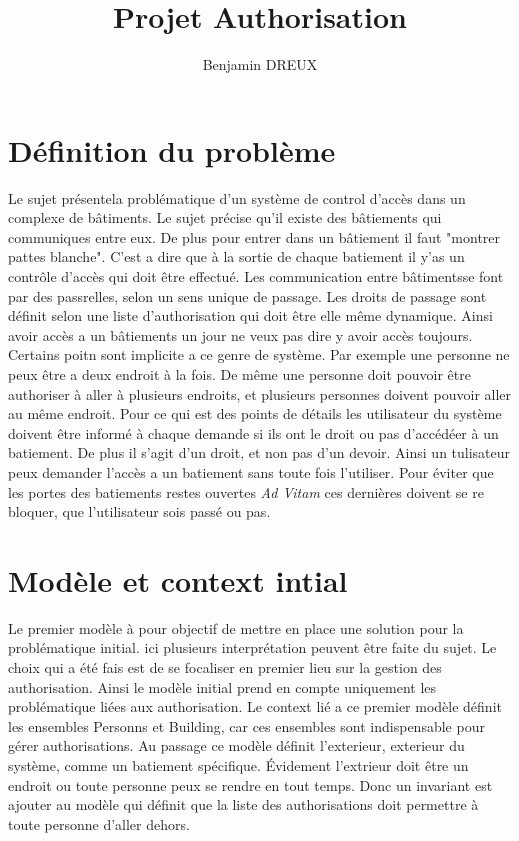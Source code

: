 \documentclass[12pt,a4paper]{article}
\title{Projet Authorisation}
\author{Benjamin DREUX}
\begin{document}
\maketitle
\section{Définition du problème}
Le sujet présentela problématique d'un système de control d'accès dans un complexe de bâtiments. Le sujet précise qu'il existe des bâtiements qui communiques entre eux. De plus pour entrer dans un bâtiement il faut "montrer pattes blanche". C'est a dire que à la sortie de chaque batiement il y'as un contrôle d'accès qui doit être effectué. Les communication entre bâtimentsse font par des passrelles, selon un sens unique de passage. Les droits de passage sont définit selon une liste d'authorisation qui doit être elle même dynamique. Ainsi avoir accès a un bâtiements un jour ne veux pas dire y avoir accès toujours.
Certains poitn sont implicite a ce genre de système. Par exemple une personne ne peux être a deux endroit à la fois. De même une personne doit pouvoir être authoriser à aller à plusieurs endroits, et plusieurs personnes doivent pouvoir aller au même endroit.
 Pour ce qui est des points de détails les utilisateur du système doivent être informé à chaque demande si ils ont le droit ou pas d'accédéer à un batiement. De plus il s'agit d'un droit, et non pas d'un devoir. Ainsi un tulisateur peux demander l'accès a un batiement sans toute fois l'utiliser. Pour éviter que les portes des batiements restes ouvertes \emph{Ad Vitam} ces dernières doivent se re bloquer, que l'utilisateur sois passé ou pas.
\section{Modèle et context intial}
Le premier modèle à pour objectif de mettre en place une solution pour la problématique initial. ici plusieurs interprétation peuvent être faite du sujet. Le choix qui a été fais est de se focaliser en premier lieu sur la gestion des authorisation. Ainsi le modèle initial prend en compte uniquement les problématique liées aux authorisation. Le context lié a ce premier modèle définit les ensembles Personns et Building, car ces ensembles sont indispensable pour gérer authorisations.
Au passage ce modèle définit l'exterieur, exterieur du système, comme un batiement spécifique. Évidement l'extrieur doit être un endroit ou toute personne peux se rendre en tout temps. Donc un invariant est ajouter au modèle qui définit que la liste des authorisations doit permettre à toute personne d'aller dehors.
\end{document}
